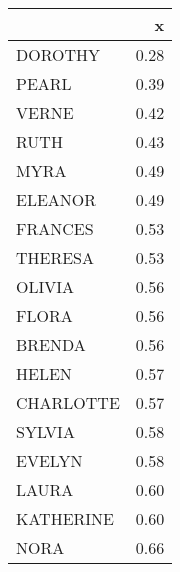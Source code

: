 
\begin{tabular}[t]{l|r}
\hline
  & x\\
\hline
DOROTHY & 0.28\\
\hline
PEARL & 0.39\\
\hline
VERNE & 0.42\\
\hline
RUTH & 0.43\\
\hline
MYRA & 0.49\\
\hline
ELEANOR & 0.49\\
\hline
FRANCES & 0.53\\
\hline
THERESA & 0.53\\
\hline
OLIVIA & 0.56\\
\hline
FLORA & 0.56\\
\hline
BRENDA & 0.56\\
\hline
HELEN & 0.57\\
\hline
CHARLOTTE & 0.57\\
\hline
SYLVIA & 0.58\\
\hline
EVELYN & 0.58\\
\hline
LAURA & 0.60\\
\hline
KATHERINE & 0.60\\
\hline
NORA & 0.66\\
\hline
\end{tabular}

